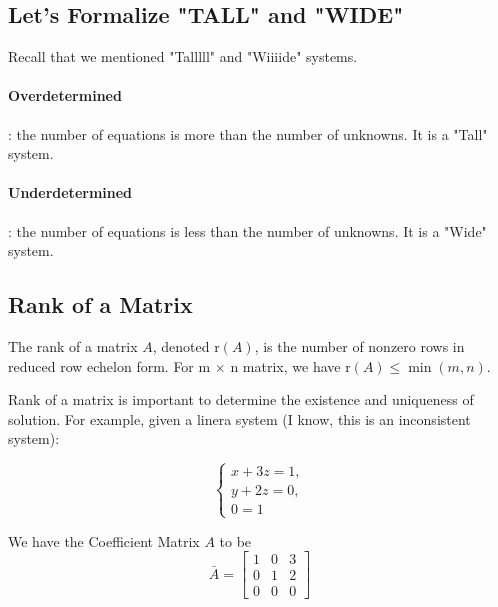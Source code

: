 \documentclass[11pt]{article}
\theoremstyle{definition}
\begin{document}
\subsection{Let's Formalize "TALL" and "WIDE"}
Recall that we mentioned "Talllll" and "Wiiiide" systems.

\paragraph{Overdetermined}: the number of equations is more than the number of unknowns. It is a "Tall" system. 

\paragraph{Underdetermined}: the number of equations is less than the number of unknowns. It is a "Wide" system.

\vspace{0.5em}
\noindent{}

\subsection{Rank of a Matrix}

The rank of a matrix $A$, denoted $\text{r}(A)$, is the  number of nonzero rows in reduced row echelon form. For m $\times$ n matrix, we have $\text{r}(A) \leq \min(m,n)$.

Rank of a matrix is important to determine the existence and uniqueness of solution. For example, given a linera system (I know, this is an inconsistent system):

\[
\begin{cases}
x+3z=1,\\
y+2z=0,\\
0=1
\end{cases}
\]

We have the Coefficient Matrix $A$ to be 
\[
\bar{A}=
\left[
\begin{array}{ccc}
1 & 0 & 3 \\
0 & 1 & 2 \\
0 & 0 & 0 
\end{array}
\right]
\]
\end{document}
